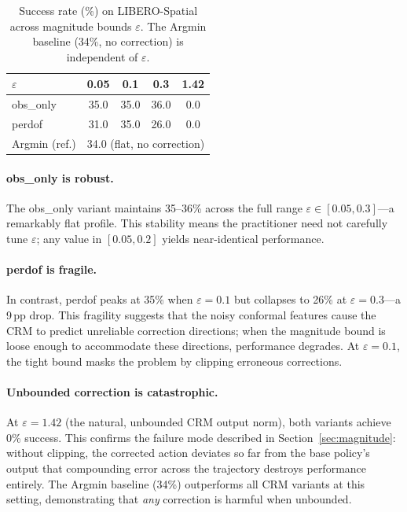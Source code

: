 \begin{table}[t]
\centering
\caption{Success rate (\%) on LIBERO-Spatial across magnitude bounds $\varepsilon$. The Argmin baseline (34\%, no correction) is independent of $\varepsilon$.}
\label{tab:magnitude}
\small
\begin{tabular}{lcccc}
\toprule
$\varepsilon$ & 0.05 & 0.1 & 0.3 & 1.42 \\
\midrule
obs\_only & 35.0 & 35.0 & 36.0 & 0.0 \\
perdof    & 31.0 & 35.0 & 26.0 & 0.0 \\
\midrule
Argmin (ref.) & \multicolumn{4}{c}{34.0 (flat, no correction)} \\
\bottomrule
\end{tabular}
\end{table}

\paragraph{obs\_only is robust.}
The obs\_only variant maintains 35--36\% across the full range $\varepsilon \in [0.05, 0.3]$---a remarkably flat profile.
This stability means the practitioner need not carefully tune $\varepsilon$; any value in $[0.05, 0.2]$ yields near-identical performance.

\paragraph{perdof is fragile.}
In contrast, perdof peaks at 35\% when $\varepsilon{=}0.1$ but collapses to 26\% at $\varepsilon{=}0.3$---a 9\,pp drop.
This fragility suggests that the noisy conformal features cause the CRM to predict unreliable correction directions; when the magnitude bound is loose enough to accommodate these directions, performance degrades.
At $\varepsilon{=}0.1$, the tight bound masks the problem by clipping erroneous corrections.

\paragraph{Unbounded correction is catastrophic.}
At $\varepsilon{=}1.42$ (the natural, unbounded CRM output norm), both variants achieve 0\% success.
This confirms the failure mode described in Section~\ref{sec:magnitude}: without clipping, the corrected action deviates so far from the base policy's output that compounding error across the trajectory destroys performance entirely.
The Argmin baseline (34\%) outperforms all CRM variants at this setting, demonstrating that \emph{any} correction is harmful when unbounded.

